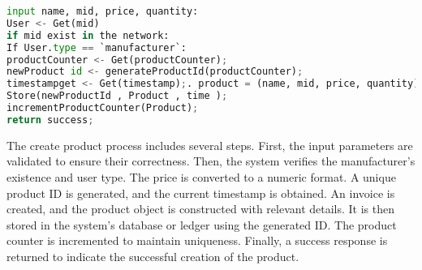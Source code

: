 \begin{lstlisting}[language=Python , caption=Create product]
input name, mid, price, quantity:
User <- Get(mid)
if mid exist in the network:
If User.type == `manufacturer`:
productCounter <- Get(productCounter);
newProduct id <- generateProductId(productCounter);
timestampget <- Get(timestamp);. product = (name, mid, price, quantity);
Store(newProductId , Product , time );
incrementProductCounter(Product);
return success;       
\end{lstlisting}
The create product process includes several steps. First, the input parameters are validated to ensure their correctness. Then, the system verifies the manufacturer's existence and user type. The price is converted to a numeric format. A unique product ID is generated, and the current timestamp is obtained. An invoice is created, and the product object is constructed with relevant details. It is then stored in the system's database or ledger using the generated ID. The product counter is incremented to maintain uniqueness. Finally, a success response is returned to indicate the successful creation of the product.